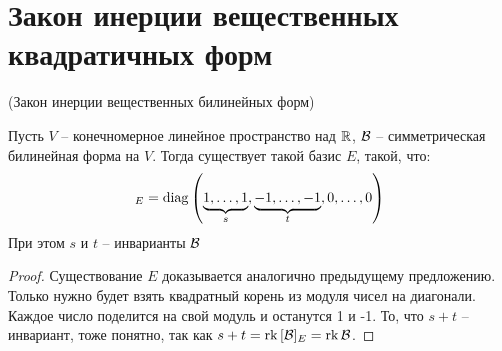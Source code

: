 \section{Закон инерции вещественных квадратичных форм}
\begin{theorem} (Закон инерции вещественных билинейных форм)

    Пусть $V$ -- конечномерное линейное пространство над $\mathbb{R}$, $\mathcal{B}$ -- симметрическая билинейная форма на $V$. Тогда 
    существует такой базис $E$, такой, что: 
    \begin{gather*}
        [\B]_E = \diag{\underbrace{1, \dots, 1}_s, \underbrace{-1, \dots, -1}_t, 0, \dots, 0}
    \end{gather*}
    При этом $s$ и $t$ -- инварианты $\mathcal{B}$ 
\end{theorem}
\begin{proof} \quad

    Существование $E$ доказывается аналогично предыдущему предложению. 
    Только нужно будет взять квадратный корень из модуля чисел на диагонали. Каждое число поделится на свой модуль и останутся 1 и -1.
    То, что $s+t$ -- инвариант, тоже понятно, так как $s+t = \operatorname{rk}{[\mathcal{B}]_E} = \operatorname{rk}{\mathcal{B}}$. 


\end{proof}
